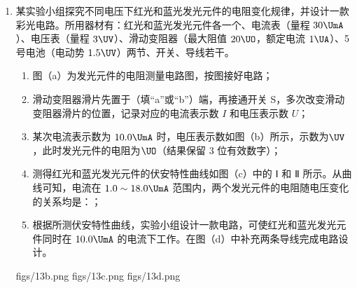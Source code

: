 \documentclass[\gkver]{gaokaozhenti}
\begin{document}
\begin{enumerate}
\item
某实验小组探究不同电压下红光和蓝光发光元件的电阻变化规律，并设计一款彩光电路。所用器材有：红光和蓝光发光元件各一个、电流表（量程 $30 \UmA$）、电压表（量程 $3 \UV$）、滑动变阻器（最大阻值 $20 \UO$，额定电流 $1 \UA$）、5 号电池（电动势 $1.5 \UV$）两节、开关、导线若干。
\begin{enumerate}
	\item
	图（a）为发光元件的电阻测量电路图，按图接好电路；
	\item
	滑动变阻器滑片先置于（填“a”或“b”）端，再接通开关 S，多次改变滑动变阻器滑片的位置，记录对应的电流表示数 $I$ 和电压表示数 $U$；
	\item
	某次电流表示数为 $10.0 \UmA$ 时，电压表示数如图（b）所示，示数为$\UV$，此时发光元件的电阻为$\UO$（结果保留 3 位有效数字）；
	\item
	测得红光和蓝光发光元件的伏安特性曲线如图（c）中的 Ⅰ 和 Ⅱ 所示。从曲线可知，电流在 $1.0 \sim 18.0 \UmA$ 范围内，两个发光元件的电阻随电压变化的关系均是：；
	\item
	根据所测伏安特性曲线，实验小组设计一款电路，可使红光和蓝光发光元件同时在 $10.0 \UmA$ 的电流下工作。在图（d）中补充两条导线完成电路设计。
\end{enumerate}

{figs/13b.png}
{figs/13c.png}
{figs/13d.png}
\end{enumerate}
\end{document}
